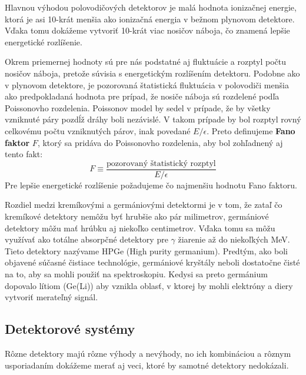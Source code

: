 \documentclass[../../main.tex]{subfiles}
\begin{document}
Hlavnou výhodou polovodičových detektorov je malá hodnota ionizačnej energie, ktorá je asi 10-krát menšia ako ionizačná energia v bežnom plynovom detektore. Vďaka tomu dokážeme vytvoriť 10-krát viac nosičov náboja, čo znamená lepšie energetické rozlíšenie. 

Okrem priemernej hodnoty sú pre nás podstatné aj fluktuácie a rozptyl počtu nosičov náboja, pretože súvisia s energetickým rozlíšením detektoru. Podobne ako v plynovom detektore, je pozorovaná štatistická fluktuácia v polovodiči menšia ako predpokladaná hodnota pre prípad, že nosiče náboja sú rozdelené podľa Poissonovho rozdelenia. Poissonov model by sedel v prípade, že by všetky vzniknuté páry pozdĺž dráhy boli nezávislé. V takom prípade by bol rozptyl rovný celkovému počtu vzniknutých párov, inak povedané $E/\epsilon$. Preto definujeme \textbf{Fano faktor} $F$, ktorý sa pridáva do Poissonovho rozdelenia, aby bol zohľadnený aj tento fakt:
\begin{equation}
F\equiv \dfrac{\text{pozorovaný štatistický rozptyl}}{E/\epsilon}
\end{equation}
Pre lepšie energetické rozlíšenie požadujeme čo najmenšiu hodnotu Fano faktoru.

Rozdiel medzi kremíkovými a germániovými detektormi je v tom, že zataľ čo kremíkové detektory nemôžu byť hrubšie ako pár milimetrov, germániové detektory môžu mať hrúbku aj niekoľko centimetrov. Vďaka tomu sa môžu využívať ako totálne absorpčné detektory pre $\gamma$ žiarenie až do niekoľkých MeV. Tieto detektory nazývame HPGe (High purity germanium). Predtým, ako boli objavené súčasné čistiace technológie, germániové kryštály neboli dostatočne čisté na to, aby sa mohli použiť na spektroskopiu. Kedysi sa preto germánium dopovalo lítiom (Ge(Li)) aby vznikla oblasť, v ktorej by mohli elektróny a diery vytvoriť merateľný signál.

\subsection{Detektorové systémy}

Rôzne detektory majú rôzne výhody a nevýhody, no ich kombináciou a rôznym usporiadaním dokážeme merať aj veci, ktoré by samotné detektory nedokázali.
\end{document}
